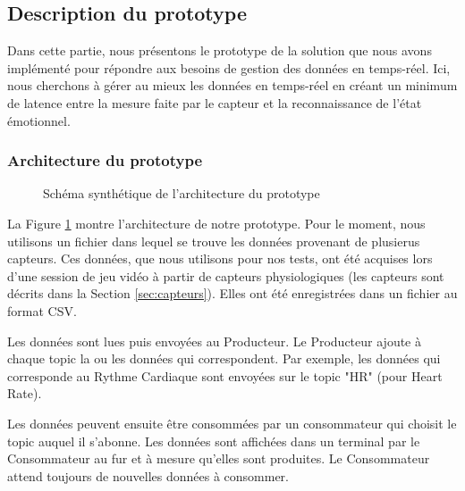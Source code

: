\documentclass[11pt]{article}
\begin{document}
	\subsection{Description du prototype}\label{sec:protodesc}
		Dans cette partie, nous présentons le prototype de la solution que nous avons implémenté pour répondre aux besoins de gestion des données en temps-réel.
		Ici, nous cherchons à gérer au mieux les données en temps-réel en créant un minimum de latence entre la mesure faite par le capteur et la reconnaissance de l'état émotionnel.
		\subsubsection{Architecture du prototype}\label{sec:protoarchi}
			\begin{figure}
				\centering
				\caption{Schéma synthétique de l'architecture du prototype}
				\label{fig:archiproto}
			\end{figure}
			La Figure \ref{fig:archiproto} montre l'architecture de notre prototype.
			Pour le moment, nous utilisons un fichier dans lequel se trouve les données provenant de plusierus capteurs.
			Ces données, que nous utilisons pour nos tests, ont été acquises lors d'une session de jeu vidéo à partir de capteurs physiologiques (les capteurs sont décrits dans la Section \ref{sec:capteurs}). 
			Elles ont été enregistrées dans un fichier au format CSV.\par
			Les données sont lues puis envoyées au Producteur.
			Le Producteur ajoute à chaque topic la ou les données qui correspondent.
			Par exemple, les données qui corresponde au Rythme Cardiaque sont envoyées sur le topic "HR" (pour Heart Rate).\par
			Les données peuvent ensuite être consommées par un consommateur qui choisit le topic auquel il s'abonne.
			Les données sont affichées dans un terminal par le Consommateur au fur et à mesure qu'elles sont produites.
			Le Consommateur attend toujours de nouvelles données à consommer.
\end{document}
